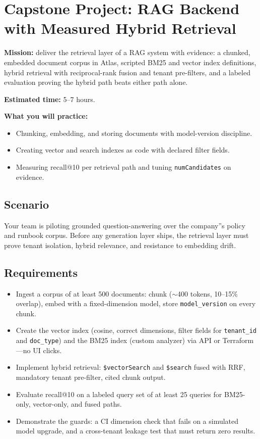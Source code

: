 \section{Capstone Project: RAG Backend with Measured Hybrid Retrieval}\label{sec:ch14-capstone}

\begin{capstonebox}
\textbf{Mission:} deliver the retrieval layer of a RAG system with evidence: a chunked, embedded document corpus in Atlas, scripted BM25 and vector index definitions, hybrid retrieval with reciprocal-rank fusion and tenant pre-filters, and a labeled evaluation proving the hybrid path beats either path alone.

\textbf{Estimated time:} 5--7 hours.

\textbf{What you will practice:}
\begin{itemize}
    \item Chunking, embedding, and storing documents with model-version discipline.
    \item Creating vector and search indexes as code with declared filter fields.
    \item Measuring recall@10 per retrieval path and tuning \texttt{numCandidates} on evidence.
\end{itemize}
\end{capstonebox}

\subsection*{Scenario}
Your team is piloting grounded question-answering over the company''s policy and runbook corpus. Before any generation layer ships, the retrieval layer must prove tenant isolation, hybrid relevance, and resistance to embedding drift.

\subsection*{Requirements}
\begin{itemize}
    \item Ingest a corpus of at least 500 documents: chunk (${\sim}$400 tokens, 10--15\% overlap), embed with a fixed-dimension model, store \texttt{model\_version} on every chunk.
    \item Create the vector index (cosine, correct dimensions, filter fields for \texttt{tenant\_id} and \texttt{doc\_type}) and the BM25 index (custom analyzer) via API or Terraform---no UI clicks.
    \item Implement hybrid retrieval: \texttt{\$vectorSearch} and \texttt{\$search} fused with RRF, mandatory tenant pre-filter, cited chunk output.
    \item Evaluate recall@10 on a labeled query set of at least 25 queries for BM25-only, vector-only, and fused paths.
    \item Demonstrate the guards: a CI dimension check that fails on a simulated model upgrade, and a cross-tenant leakage test that must return zero results.
\end{itemize}


